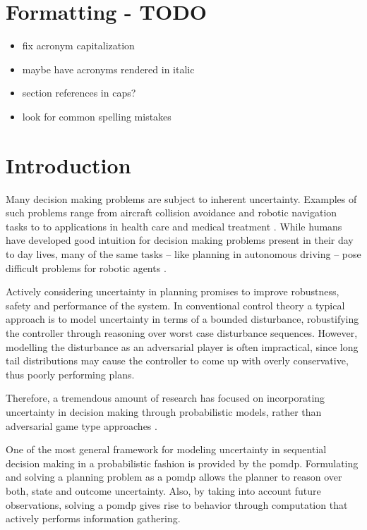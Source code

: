 \chapter{Formatting - TODO}

\begin{itemize}
  \item fix acronym capitalization
  \item maybe have acronyms rendered in italic
  \item section references in caps?
  \item look for common spelling mistakes
\end{itemize}
\chapter{Introduction}\label{chap:introduction}

Many decision making problems are subject to inherent uncertainty. Examples of
such problems range from aircraft collision avoidance and robotic navigation tasks to
to applications in health care and medical treatment
\cite{kochenderfer2012next, schaefer2005modeling}. While humans have
developed good intuition for decision making problems present in their day to
day lives, many of the same tasks -- like planning in autonomous driving --
pose difficult problems for robotic agents \cite{levinson2011towards}.

Actively considering uncertainty in planning promises to improve robustness,
safety and performance of the system. In conventional control theory a typical
approach is to model uncertainty in terms of a bounded disturbance,
robustifying the controller through reasoning over worst case disturbance
sequences. However, modelling the disturbance as an adversarial player is often
impractical, since long tail distributions may cause the controller to come up
with overly conservative, thus poorly performing plans.

Therefore, a tremendous amount of research has focused on incorporating
uncertainty in decision making through probabilistic models, rather than
adversarial game type approaches \cite{roy1999coastal, amato2015planning,
fisac2018probabilistically, choudhury2019dynamic}.

One of the most general framework for modeling uncertainty in sequential
decision making in a probabilistic fashion is provided by the \ac{pomdp}.
Formulating and solving a planning problem as a \ac{pomdp} allows the planner
to reason over both, state and outcome uncertainty. Also, by taking into
account future observations, solving a \ac{pomdp} gives rise to behavior
through computation that actively performs information gathering.

